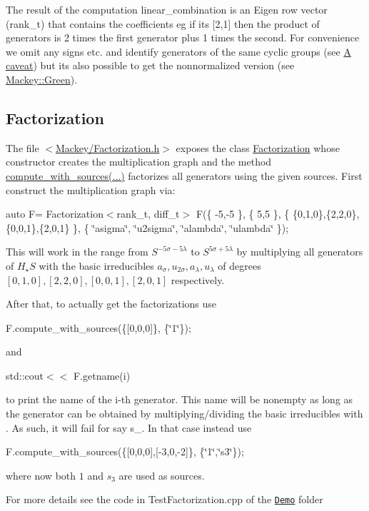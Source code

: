 The result of the computation {\ttfamily linear\+\_\+combination} is an Eigen row vector ({\ttfamily rank\+\_\+t}) that contains the coefficients eg if it\textquotesingle{}s {\ttfamily \mbox{[}2,1\mbox{]}} then the product of generators is 2 times the first generator plus 1 times the second. For convenience we omit any signs etc. and identify generators of the same cyclic groups (see \hyperlink{math_caveat}{A caveat}) but it\textquotesingle{}s also possible to get the nonnormalized version (see \hyperlink{classMackey_1_1Green}{Mackey\+::\+Green}).\hypertarget{use_step1fact}{}\subsection{Factorization}\label{use_step1fact}
The file {\ttfamily $<$\hyperlink{Factorization_8h}{Mackey/\+Factorization.\+h}$>$} exposes the class \hyperlink{classMackey_1_1Factorization}{Factorization} whose constructor creates the multiplication graph and the method \hyperlink{classMackey_1_1Factorization_a2e135a37687fc3d69cd16a8729dd19eb}{compute\+\_\+with\+\_\+sources(...)} factorizes all generators using the given sources. First construct the multiplication graph via\+:

{\ttfamily auto F= Factorization$<$rank\+\_\+t, diff\+\_\+t$>$ F(\{ -\/5,-\/5 \}, \{ 5,5 \}, \{ \{0,1,0\},\{2,2,0\},\{0,0,1\},\{2,0,1\} \}, \{ \char`\"{}asigma\char`\"{}, \char`\"{}u2sigma\char`\"{}, \char`\"{}alambda\char`\"{}, \char`\"{}ulambda\char`\"{} \});}

This will work in the range from $S^{-5\sigma-5\lambda}$ to $S^{5\sigma+5\lambda}$ by multiplying all generators of $H_{\star}S$ with the basic irreducibles $ a_{\sigma}, u_{2\sigma}, a_{\lambda}, u_{\lambda}$ of degrees $[0,1,0],[2,2,0],[0,0,1],[2,0,1]$ respectively.

After that, to actually get the factorizations use

{\ttfamily F.\+compute\+\_\+with\+\_\+sources(\{\mbox{[}0,0,0\mbox{]}\}, \{\char`\"{}1\char`\"{}\});}

and

{\ttfamily std\+::cout$<$$<$ F.\+getname(i) }

to print the name of the {\ttfamily i}-\/th generator. This name will be nonempty as long as the generator can be obtained by multiplying/dividing the basic irreducibles with {}. As such, it will fail for say {\ttfamily s\+\_}. In that case instead use

{\ttfamily F.\+compute\+\_\+with\+\_\+sources(\{\mbox{[}0,0,0\mbox{]},\mbox{[}-\/3,0,-\/2\mbox{]}\}, \{\char`\"{}1\char`\"{},\char`\"{}s3\char`\"{}\});}

where now both $1$ and $s_3$ are used as sources.

For more details see the code in Test\+Factorization.\+cpp of the \href{https://github.com/NickG-Math/Mackey/tree/master/Demo}{\tt Demo} folder 